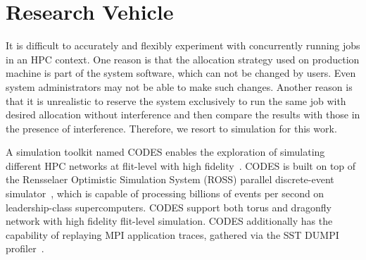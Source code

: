 \section{Research Vehicle}
\label{sec:codes}

It is difficult to accurately and flexibly experiment with concurrently running jobs in an HPC context. 
One reason is that the allocation strategy used on production machine is part of the system software, 
which can not be changed by users. 
Even system administrators may not be able to make such changes. 
Another reason is that it is unrealistic to reserve the system exclusively 
to run the same job with desired allocation without interference and 
then compare the results with those in the presence of interference. 
Therefore, we resort to simulation for this work.


A simulation toolkit named CODES enables the exploration of simulating 
different HPC networks at flit-level with high fidelity~\cite{Jason-2011, mubarak-sc2012}. 
CODES is built on top of the Rensselaer Optimistic Simulation System (ROSS) parallel discrete-event simulator~\cite{ross}, 
which is capable of processing billions of events per second on leadership-class supercomputers. 
CODES support both torus and dragonfly network with high fidelity flit-level simulation.
CODES additionally has the capability of replaying MPI application traces, 
gathered via the SST DUMPI profiler~\cite{sst}.
%

